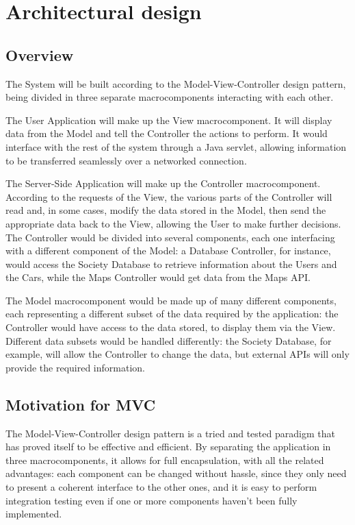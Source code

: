 \documentclass[12pt]{article}
\begin{document}
\clearpage
\section{Architectural design}
\subsection{Overview}
The System will be built according to the Model-View-Controller design pattern, being divided in three separate macrocomponents interacting with each other.

The User Application will make up the View macrocomponent. It will display data from the Model and tell the Controller the actions to perform. It would interface with the rest of the system through a Java servlet, allowing information to be transferred seamlessly over a networked connection.

The Server-Side Application will make up the Controller macrocomponent. According to the requests of the View, the various parts of the Controller will read and, in some cases, modify the data stored in the Model, then send the appropriate data back to the View, allowing the User to make further decisions. The Controller would be divided into several components, each one interfacing with a different component of the Model: a Database Controller, for instance, would access the Society Database to retrieve information about the Users and the Cars, while the Maps Controller would get data from the Maps API.

The Model macrocomponent would be made up of many different components, each representing a different subset of the data required by the application: the Controller would have access to the data stored, to display them via the View. Different data subsets would be handled differently: the Society Database, for example, will allow the Controller to change the data, but external APIs will only provide the required information.

\subsection{Motivation for MVC}
The Model-View-Controller design pattern is a tried and tested paradigm that has proved itself to be effective and efficient. By separating the application in three macrocomponents, it allows for full encapsulation, with all the related advantages: each component can be changed without hassle, since they only need to present a coherent interface to the other ones, and it is easy to perform integration testing even if one or more components haven't been fully implemented.
\end{document}

